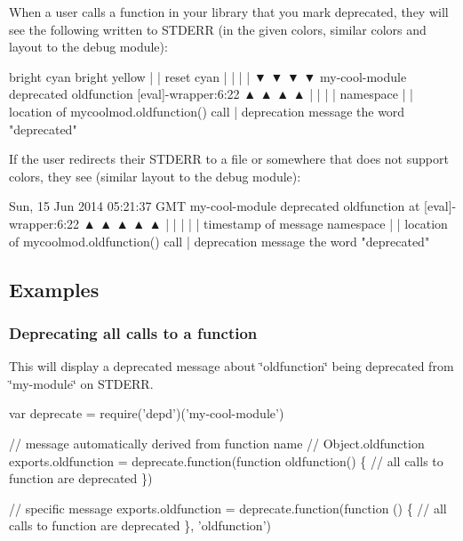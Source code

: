 When a user calls a function in your library that you mark deprecated, they will see the following written to S\+T\+D\+E\+RR (in the given colors, similar colors and layout to the {\ttfamily debug} module)\+:


\begin{DoxyCode}
bright cyan    bright yellow
|              |          reset       cyan
|              |          |           |
▼              ▼          ▼           ▼
my-cool-module deprecated oldfunction [eval]-wrapper:6:22
▲              ▲          ▲           ▲
|              |          |           |
namespace      |          |           location of mycoolmod.oldfunction() call
               |          deprecation message
               the word "deprecated"
\end{DoxyCode}


If the user redirects their S\+T\+D\+E\+RR to a file or somewhere that does not support colors, they see (similar layout to the {\ttfamily debug} module)\+:


\begin{DoxyCode}
Sun, 15 Jun 2014 05:21:37 GMT my-cool-module deprecated oldfunction at [eval]-wrapper:6:22
▲                             ▲              ▲          ▲              ▲
|                             |              |          |              |
timestamp of message          namespace      |          |             location of mycoolmod.oldfunction()
       call
                                             |          deprecation message
                                             the word "deprecated"
\end{DoxyCode}


\subsection*{Examples}

\subsubsection*{Deprecating all calls to a function}

This will display a deprecated message about \char`\"{}oldfunction\char`\"{} being deprecated from \char`\"{}my-\/module\char`\"{} on S\+T\+D\+E\+RR.


\begin{DoxyCode}
var deprecate = require('depd')('my-cool-module')

// message automatically derived from function name
// Object.oldfunction
exports.oldfunction = deprecate.function(function oldfunction() \{
  // all calls to function are deprecated
\})

// specific message
exports.oldfunction = deprecate.function(function () \{
  // all calls to function are deprecated
\}, 'oldfunction')
\end{DoxyCode}


